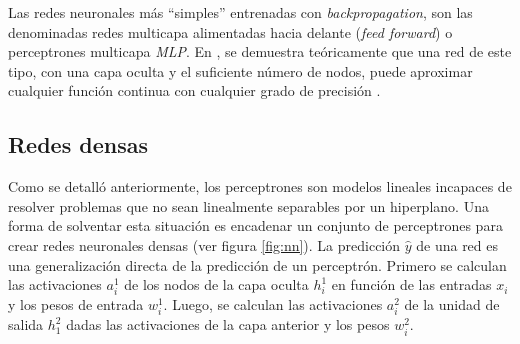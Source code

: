 Las redes neuronales más ``simples'' entrenadas con {\it backpropagation}, son las denominadas redes multicapa
alimentadas hacia delante ({\it feed forward}) o perceptrones multicapa {\it MLP}. En
\citeyear{funahashi1989approximate}, se demuestra teóricamente que una red de este tipo, con una capa oculta y el
suficiente número de nodos, puede aproximar cualquier función continua con cualquier grado de precisión \parencite{funahashi1989approximate}.

\subsection{Redes densas}
Como se detalló anteriormente, los perceptrones son modelos lineales incapaces de resolver problemas que no sean
linealmente separables por un hiperplano. Una forma de solventar esta situación es encadenar un conjunto de
perceptrones para crear redes neuronales densas (ver figura \ref{fig:nn}). La predicción $\hat{y}$ de una red es una
generalización directa de la predicción de un perceptrón. Primero se calculan las activaciones $a_i^1$ de los nodos de
la capa oculta $h_i^1$ en función de las entradas $x_i$ y los pesos de entrada $w_i^1$. Luego, se calculan las
activaciones $a_i^2$ de la unidad de salida $h_1^2$ dadas las activaciones de la capa anterior y los pesos $w_i^2$.

